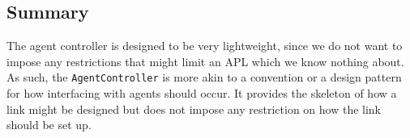 \subsection*{Summary}

The agent controller is designed to be very lightweight, since we
do not want to impose any restrictions that might limit an APL which
we know nothing about. As such, the \texttt{AgentController} is more
akin to a convention or a design pattern for how interfacing with
agents should occur. It provides the skeleton of how a link might
be designed but does not impose any restriction on how the link should
be set up.

